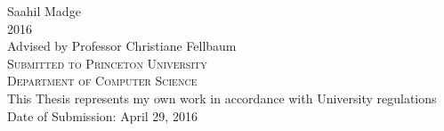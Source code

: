 \documentclass[12pt]{report}
\begin{document}
\begin{titlepage}
%
%

    \vspace{2.5cm}

    {\large Saahil Madge \\ 2016 \\ Advised by Professor
    Christiane Fellbaum\\}
    \vspace{2cm}
    {\scshape\large Submitted to Princeton University \\ Department of Computer Science\\}
    \vspace{2cm}
    {\normalsize This Thesis represents my own work in accordance with University regulations\\}
    \vspace{1cm}
    {\normalsize Date of Submission: April 29, 2016}

\end{titlepage}
\end{document}
